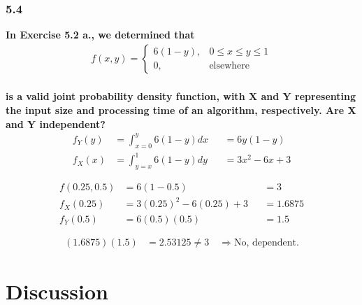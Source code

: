 \documentclass[
	a4paper, %
	10pt, %
	unnumberedsections, %
	twoside, %
]{LTJournalArticle}
\begin{document}
\subsubsection{5.4}
\textbf{In Exercise 5.2 a., we determined that}
\begin{equation*}
    \begin{aligned}
        f(x, y) =
        \begin{cases}
            6(1 - y), & 0 \le x \le y \le 1 \\
            0, & \text{elsewhere}
        \end{cases}
    \end{aligned}
\end{equation*} \\
\textbf{is a valid joint probability density function, with X and Y representing the input size and processing time of an algorithm, respectively. Are X and Y independent?}
\begin{equation*}
    \begin{aligned}
        f_Y(y) &= \int_{x = 0}^y 6(1 - y)dx &&= 6y(1 - y) \\
        f_X(x) &= \int_{y = x}^1 6(1 - y)dy &&= 3x^2 - 6x + 3 \\ \\
        \end{aligned}
\end{equation*}
\begin{equation*}
    \begin{aligned}
        f(0.25, 0.5) &= 6(1 - 0.5) &&= 3 \\
        f_X(0.25) &= 3(0.25)^2 - 6(0.25) + 3 &&= 1.6875 \\
        f_Y(0.5) &= 6(0.5)(0.5) &&= 1.5 \\ \\
    \end{aligned}
\end{equation*}
\begin{equation*}
    \begin{aligned}
        (1.6875)(1.5) &= 2.53125 \neq 3 \quad \Rightarrow \text{No, dependent.}
    \end{aligned}
\end{equation*}


\section{Discussion}
\end{document}
